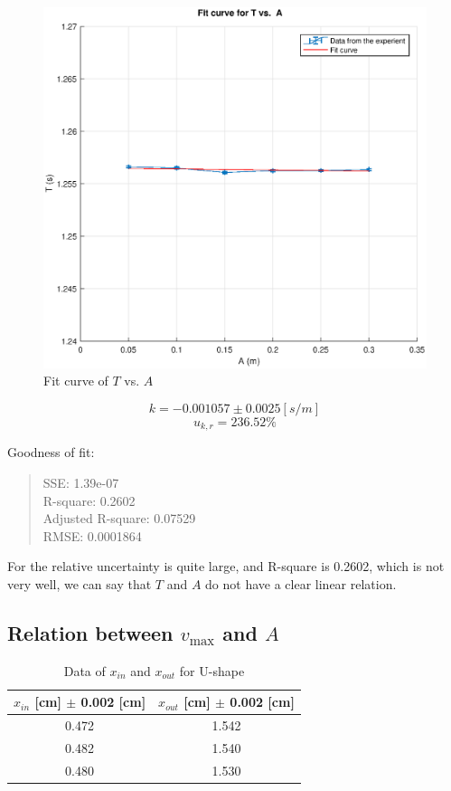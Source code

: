 \begin{figure}[H]
	\centering
	\includegraphics[width=13cm]{matlab/fitfig/a1}
	\caption{Fit curve of $T$ vs. $A$}
\end{figure}

$$ k =  -0.001057 \pm 0.0025  [s/m] $$
$$ u_{k,r} = 236.52 \% $$

Goodness of fit:
\begin{quote}
	\centering
 SSE: 1.39e-07 				  \\ 
 R-square: 0.2602 			  \\ 
 Adjusted R-square: 0.07529   \\ 
 RMSE: 0.0001864 			  \\ 
\end{quote}

For the relative uncertainty is quite large, and R-square is 0.2602, which is not very well,
we can say that $T$ and $A$ do not have a clear linear relation.


\subsection{Relation between $ v_{\max}$ and $A$}

\begin{table}[H]
	\centering
	\begin{tabular}{|c|c|}
	\hline
	$x_{in}$ [cm] $\pm$ 0.002 [cm] & $x_{out}$ [cm] $\pm$ 0.002 [cm]  \\ \hline
	0.472 & 1.542 \\ \hline
	0.482 & 1.540 \\ \hline
	0.480 & 1.530 \\ \hline
	\end{tabular}
	\caption{Data of $x_{in}$ and $x_{out}$ for U-shape}
\label{L_inout}
\end{table}


